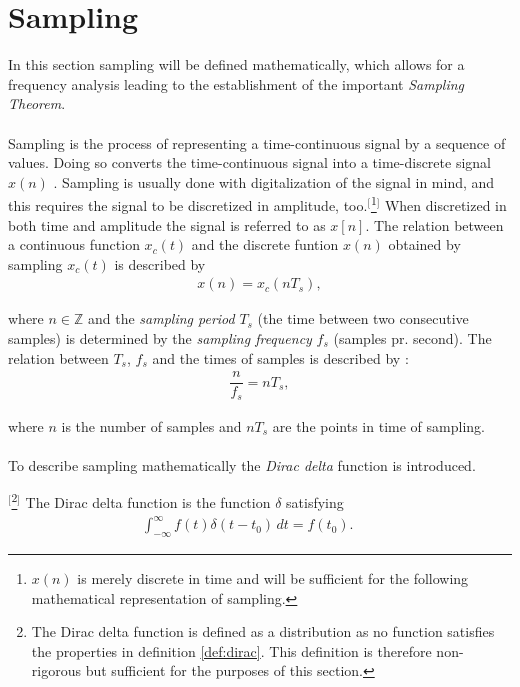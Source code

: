 \section{Sampling} \label{sec:sampling}
In this section sampling will be defined mathematically, which allows for a frequency analysis leading to the establishment of the important \textit{Sampling Theorem}.
\\ \\
Sampling is the process of representing a time-continuous signal by a sequence of values. Doing so converts the time-continuous signal into a time-discrete signal $x(n)$ \cite{pelgrom}. Sampling is usually done with digitalization of the signal in mind, and this requires the signal to be discretized in amplitude, too.$^[$\footnote{$x(n)$ is merely discrete in time and will be sufficient for the following mathematical representation of sampling.}$^]$ When discretized in both time and amplitude the signal is referred to as $x[n]$. The relation between a continuous function $x_c(t)$ and the discrete funtion $x(n)$ obtained by sampling $x_c(t)$ is described by
\begin{align} \label{eq:sampling_principle}
x(n)=x_c(nT_s),
\end{align}

where $n \in \mathbb{Z}$ and the \textit{sampling period} $T_s$ (the time between two consecutive samples) is determined by the \textit{sampling frequency} $f_s$ (samples pr. second). The relation between $T_s$, $f_s$ and the times of samples is described by \cite{page 163, pelgrom}:
\begin{align} \label{eq:sample_freq}
\dfrac{n}{f_s} = nT_s,
\end{align}

where $n$ is the number of samples and $nT_s$ are the points in time of sampling.
\\ \\
To describe sampling mathematically the \textit{Dirac delta} function is introduced.

\begin{definition}$^[$\footnote{The Dirac delta function is defined as a distribution as no function satisfies the properties in definition \ref{def:dirac}. This definition is therefore non-rigorous but sufficient for the purposes of this section.}$^]$ \label{def:dirac}
The Dirac delta function is the function $\delta$ satisfying
\begin{align}
\int_{-\infty}^{\infty} \! f(t)\delta(t-t_0) \, dt=f(t_0).\phantom{mm}
\end{align}
\end{definition}

